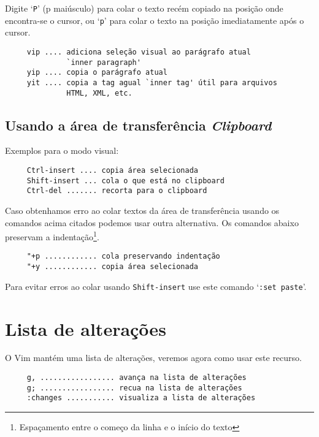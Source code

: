 Digite `{\tt P}' (p maiúsculo) para colar o texto recém copiado na posição onde
encontra-se o cursor, ou `{\tt p}' para colar o texto na posição imediatamente
após o cursor.

\begin{verbatim}
     vip .... adiciona seleção visual ao parágrafo atual 
              `inner paragraph'
     yip .... copia o parágrafo atual
     yit .... copia a tag agual `inner tag' útil para arquivos 
              HTML, XML, etc.
\end{verbatim}

\subsection{Usando a área de transferência {\em Clipboard}}

Exemplos para o modo visual:

\begin{verbatim}
     Ctrl-insert .... copia área selecionada 
     Shift-insert ... cola o que está no clipboard
     Ctrl-del ....... recorta para o clipboard
\end{verbatim}

Caso obtenhamos erro ao colar textos da área de transferência usando os
comandos acima citados podemos usar outra alternativa.  Os comandos abaixo
preservam a indentação\footnote{Espaçamento entre o começo da linha e o início
do texto}.

\begin{verbatim}
     "+p ............ cola preservando indentação
     "+y ............ copia área selecionada
\end{verbatim}

{\Large {}} Para evitar erros ao colar usando {\tt Shift-insert} 
use este comando `{\tt :set paste}'.


\section{Lista de alterações}

O Vim mantém uma lista de alterações, veremos agora como usar este recurso.

\begin{verbatim}
     g, ................. avança na lista de alterações
     g; ................. recua na lista de alterações
     :changes ........... visualiza a lista de alterações
\end{verbatim}


